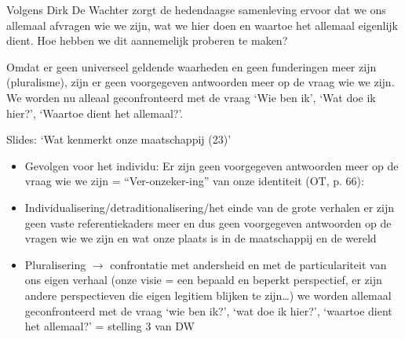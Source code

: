 \documentclass[main.tex]{subfiles}
\begin{document}
\begin{examenvraag}
    \begin{vraag}
        Volgens Dirk De Wachter zorgt de hedendaagse samenleving ervoor dat we ons allemaal afvragen wie we zijn, wat we hier doen en waartoe het allemaal eigenlijk dient. Hoe hebben we dit aannemelijk proberen te maken?
    \end{vraag}

    \begin{antwoord}
        Omdat er geen universeel geldende waarheden en geen funderingen meer zijn (pluralisme), zijn er geen voorgegeven antwoorden meer op de vraag wie we zijn.
        We worden nu alleaal geconfronteerd met de vraag `Wie ben ik', `Wat doe ik hier?', `Waartoe dient het allemaal?'.
        \begin{citaat}{Slides: `Wat kenmerkt onze maatschappij (23)'}
            \begin{itemize}
            \item Gevolgen voor het individu:
            Er zijn geen voorgegeven antwoorden meer op de vraag wie we zijn = “Ver-onzeker-ing” van onze identiteit (OT, p. 66):
            \item Individualisering/detraditionalisering/het einde van de grote verhalen er zijn geen vaste referentiekaders meer en dus geen voorgegeven antwoorden op de vragen wie we zijn en wat onze plaats is in de maatschappij en de wereld
            \item Pluralisering $\rightarrow$ confrontatie met andersheid en met de particulariteit van ons eigen verhaal (onze visie = een bepaald en beperkt perspectief, er zijn andere perspectieven die eigen legitiem blijken te zijn…) we worden allemaal geconfronteerd met de vraag ‘wie ben ik?’, ‘wat doe ik hier?’, ‘waartoe dient het allemaal?’ = stelling 3 van DW
    \end{itemize}
        \end{citaat}
    \end{antwoord}
\end{examenvraag}
\end{document}
